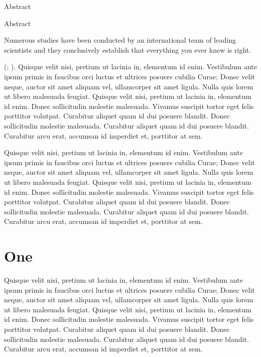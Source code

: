 \documentclass{scrbook}
\makeatletter
\newenvironment{abstract}{%
  \if@titlepage
    \titlepage
    \null\vfil
    \@beginparpenalty\@lowpenalty
    \if@abstrt
      \begin{center}
        \normalfont\sectfont\nobreak\abstractname
        \@endparpenalty\@M
      \end{center}
    \fi
  \else
    \if@twocolumn\if@abstrt
        \addsec*{\abstractname}
      \fi
    \else
      \if@abstrt
        \small
        \begin{center}
          {\normalfont\sectfont\nobreak\abstractname
            \vspace{-.5em}\vspace{\z@}}%
        \end{center}
      \fi
      \quotation
    \fi
  \fi
}{%
  \if@titlepage
    \par\vfil\null\endtitlepage
  \else
    \if@twocolumn\else\endquotation\fi
  \fi
}
\newcommand*\abstractname{Abstract}
\makeatother
\begin{document}
\begin{abstract}
Numerous studies have been conducted by an international team of leading
scientists and they conclusively establish that everything you ever knew
is right.
\end{abstract}
%
%
(;
).
Quisque velit nisi, pretium ut lacinia in, elementum id enim. Vestibulum
ante ipsum primis in faucibus orci luctus et ultrices posuere cubilia
Curae; Donec velit neque, auctor sit amet aliquam vel, ullamcorper sit
amet ligula. Nulla quis lorem ut libero malesuada feugiat. Quisque velit
nisi, pretium ut lacinia in, elementum id enim. Donec sollicitudin
molestie malesuada. Vivamus suscipit tortor eget felis porttitor
volutpat. Curabitur aliquet quam id dui posuere blandit. Donec
sollicitudin molestie malesuada. Curabitur aliquet quam id dui posuere
blandit. Curabitur arcu erat, accumsan id imperdiet et, porttitor at
sem.

Quisque velit nisi, pretium ut lacinia in, elementum id enim. Vestibulum
ante ipsum primis in faucibus orci luctus et ultrices posuere cubilia
Curae; Donec velit neque, auctor sit amet aliquam vel, ullamcorper sit
amet ligula. Nulla quis lorem ut libero malesuada feugiat. Quisque velit
nisi, pretium ut lacinia in, elementum id enim. Donec sollicitudin
molestie malesuada. Vivamus suscipit tortor eget felis porttitor
volutpat. Curabitur aliquet quam id dui posuere blandit. Donec
sollicitudin molestie malesuada. Curabitur aliquet quam id dui posuere
blandit. Curabitur arcu erat, accumsan id imperdiet et, porttitor at
sem.

\section{One}\label{c2-c2-one}

Quisque velit nisi, pretium ut lacinia in, elementum id enim. Vestibulum
ante ipsum primis in faucibus orci luctus et ultrices posuere cubilia
Curae; Donec velit neque, auctor sit amet aliquam vel, ullamcorper sit
amet ligula. Nulla quis lorem ut libero malesuada feugiat. Quisque velit
nisi, pretium ut lacinia in, elementum id enim. Donec sollicitudin
molestie malesuada. Vivamus suscipit tortor eget felis porttitor
volutpat. Curabitur aliquet quam id dui posuere blandit. Donec
sollicitudin molestie malesuada. Curabitur aliquet quam id dui posuere
blandit. Curabitur arcu erat, accumsan id imperdiet et, porttitor at
sem.
\end{document}
